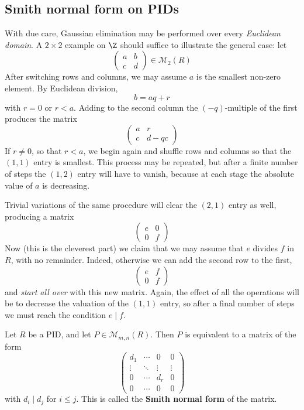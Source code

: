 \subsection{Smith normal form on PIDs}
With due care, Gaussian elimination may be performed over every \textit{Euclidean domain}. A $2\times 2$ example on $\Z$ should suffice to illustrate the general case: let
\[\begin{pmatrix}
a&b\\
c&d
\end{pmatrix}\in\mathcal{M}_2(R)\]
After switching rows and columns, we may assume $a$ is the smallest non-zero element. By Euclidean division,
\[b=aq+r\]
with $r=0$ or $r<a$. Adding to the second column the $(-q)$-multiple of the first produces the matrix
\[\begin{pmatrix}
a&r\\
c&d-qc
\end{pmatrix}\]
If $r\neq0$, so that $r<a$, we begin again and shuffle rows and columns so that the $(1,1)$ entry is smallest. This process may be repeated, but after a finite number of steps the $(1,2)$ entry will have to vanish, because at each stage the absolute value of $a$ is decreasing.\par
Trivial variations of the same procedure will clear the $(2,1)$ entry as well, producing a matrix
\[\begin{pmatrix}
e&0\\
0&f
\end{pmatrix}\]
Now (this is the cleverest part) we claim that we may assume that $e$ divides $f$ in $R$, with no remainder. Indeed, otherwise we can add the second row to the first,
\[\begin{pmatrix}
e &f\\
0&f
\end{pmatrix}\]
and \textit{start all over} with this new matrix. Again, the effect of all the operations will be to decrease the valuation of the $(1,1)$ entry, so after a final number of steps we must reach the condition $e\mid f$.\par
\begin{theorem}\label{Smith norm form}
Let $R$ be a PID, and let $P\in\mathcal{M}_{m,n}(R)$. Then $P$ is equivalent to a matrix of the form
\[\left(\begin{array}{ccc|c}
d_1&\cdots&0&0\\
\vdots&\ddots&\vdots&\vdots\\
0&\cdots&d_r&0\\
\hline
0&\cdots&0&0
\end{array}\right)\]
with $d_i\mid d_j$ for $i\leq j$. This is called the \textbf{Smith normal form} of the matrix.
\end{theorem}
